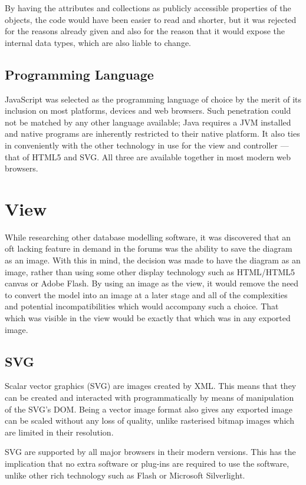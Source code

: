 By having the attributes and collections as publicly accessible properties of the objects, the code would have been easier to read and shorter, but it was rejected for the reasons already given and also for the reason that it would expose the internal data types, which are also liable to change.

\subsection{Programming Language}
JavaScript was selected as the programming language of choice by the merit of its inclusion on most platforms, devices and web browsers. Such penetration could not be matched by any other language available; Java requires a JVM installed and native programs are inherently restricted to their native platform. It also ties in conveniently with the other technology in use for the view and controller --- that of HTML5 and SVG. All three are available together in most modern web browsers.

\section{View}
While researching other database modelling software, it was discovered that an oft lacking feature in demand in the forums was the ability to save the diagram as an image. With this in mind, the decision was made to have the diagram as an image, rather than using some other display technology such as HTML\slash HTML5 canvas or Adobe Flash. By using an image as the view, it would remove the need to convert the model into an image at a later stage and all of the complexities and potential incompatibilities which would accompany such a choice. That which was visible in the view would be exactly that which was in any exported image.

\subsection{SVG}
Scalar vector graphics (SVG) are images created by XML. This means that they can be created and interacted with programmatically by means of manipulation of the SVG's DOM. Being a vector image format also gives any exported image can be scaled without any loss of quality, unlike rasterised bitmap images which are limited in their resolution.

SVG are supported by all major browsers in their modern versions. This has the implication that no extra software or plug-ins are required to use the software, unlike other rich technology such as Flash or Micro\-soft Silver\-light.

